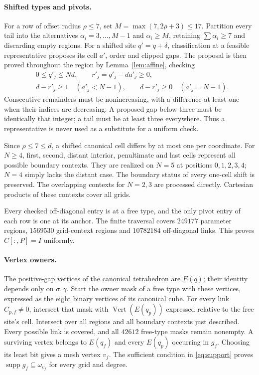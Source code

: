 \documentclass[11pt]{article}
\theoremstyle{remark}
\DeclareMathOperator{\supp}{supp}
\DeclareMathOperator{\vertices}{Vert}
\begin{document}
\paragraph{Shifted types and pivots.}
For a row of offset radius $\rho\le7$, set
$M=\max(7,2\rho+3)\le17$. Partition every tail into the alternatives
$\alpha_i=3,\ldots,M-1$ and $\alpha_i\ge M$, retaining
$\sum\alpha_i\ge7$ and discarding empty regions. For a shifted site
$q'=q+\delta$, classification at a feasible representative proposes its
cell $a'$, order and clipped gaps. The proposal is then proved throughout
the region by Lemma~\ref{lem:affine}, checking
\begin{align*}
 &0\le q'_j\le Nd,\qquad r'_j=q'_j-da'_j\ge0,\\
 &d-r'_j\ge1\quad(a'_j<N-1),\qquad d-r'_j\ge0\quad(a'_j=N-1).
\end{align*}
Consecutive remainders must be nonincreasing, with a difference at least
one when their indices are decreasing. A proposed gap below three must
be identically that integer; a tail must be at least three everywhere.
Thus a representative is never used as a substitute for a uniform check.

Since $\rho\le7\le d$, a shifted canonical cell differs by at most one
per coordinate. For $N\ge4$, first, second, distant interior, penultimate
and last cells represent all possible boundary contexts. They are realized
on $N=5$ at positions $0,1,2,3,4$; $N=4$ simply lacks the distant
case. The boundary status of every one-cell shift is preserved. The
overlapping contexts for $N=2,3$ are processed directly. Cartesian
products of these contexts cover all grids.

Every checked off-diagonal entry is at a free type, and the only pivot
entry of each row is one at its anchor. The finite traversal covers
$249177$ parameter regions, $1569530$ grid-context regions and
$10782184$ off-diagonal links. This proves $C[:,P]=I$ uniformly.

\paragraph{Vertex owners.}
The positive-gap vertices of the canonical tetrahedron are $E(q)$; their
identity depends only on $\sigma,\gamma$. Start the owner mask of a
free type with these vertices, expressed as the eight binary vertices of
its canonical cube. For every link $C_{p,f}\ne0$, intersect that mask
with $\vertices(E(q_p))$ expressed relative to the free site's cell.
Intersect over all regions and all boundary contexts just described.
Every possible link is covered, and all $42612$ free-type masks remain
nonempty. A surviving vertex belongs to $E(q_f)$ and every $E(q_p)$
occurring in $g_f$. Choosing its least bit gives a mesh vertex $v_f$.
The sufficient condition in \eqref{eq:support} proves
$\supp g_f\subseteq\omega_{v_f}$ for every grid and degree.
\end{document}

